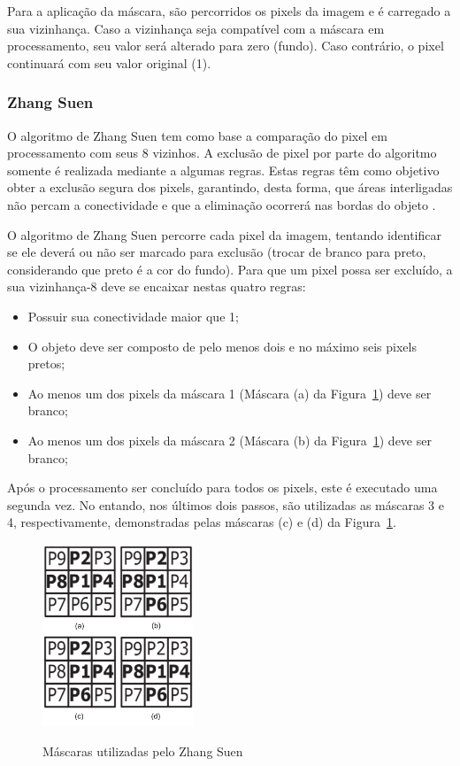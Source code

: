 \documentclass[12pt,oneside,a4paper,english,french,spanish,brazil,]{abntex2}
\begin{document}
Para a aplicação da máscara, são percorridos os pixels da imagem e é carregado a sua vizinhança. Caso a vizinhança seja compatível com a máscara em processamento, seu valor será alterado para zero (fundo). Caso contrário, o pixel continuará com seu valor original (1).

\subsubsection{Zhang Suen}

O algoritmo de Zhang Suen \cite{zhang:1984} tem como base a comparação do pixel em processamento com seus 8 vizinhos. A exclusão de pixel por parte do algoritmo somente é realizada mediante a algumas regras. Estas regras têm como objetivo obter a exclusão segura dos pixels, garantindo, desta forma, que áreas interligadas não percam a conectividade e que a eliminação ocorrerá nas bordas do objeto \cite{guilherme:2007}.

O algoritmo de Zhang Suen percorre cada pixel da imagem, tentando identificar se ele deverá ou não ser marcado para exclusão (trocar de branco para preto, considerando que preto é a cor do fundo). Para que um pixel possa ser excluído, a sua vizinhança-8 deve se encaixar nestas quatro regras:
\begin{itemize}
\item Possuir sua conectividade maior que 1;
\item O objeto deve ser composto de pelo menos dois e no máximo seis pixels pretos;
\item Ao menos um dos pixels da máscara 1 (Máscara (a) da Figura~\ref{fig:PDI_Zhang}) deve ser branco;
\item Ao menos um dos pixels da máscara 2 (Máscara (b) da Figura~\ref{fig:PDI_Zhang}) deve ser branco;
\end{itemize}

Após o processamento ser concluído para todos os pixels, este é executado uma segunda vez. No entando, nos últimos dois passos, são utilizadas as máscaras 3 e 4, respectivamente, demonstradas pelas máscaras (c) e (d) da Figura~\ref{fig:PDI_Zhang}.

\begin{figure}[ht]
\centering
\caption{Máscaras utilizadas pelo Zhang Suen}
\includegraphics[width=0.4\textwidth]{imagens/PDI_Zhang.pdf}
\label{fig:PDI_Zhang}
\end{figure}
\end{document}
